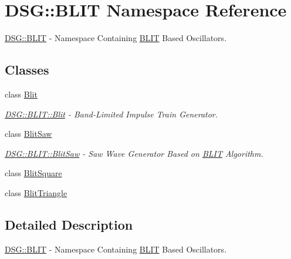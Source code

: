 \hypertarget{namespace_d_s_g_1_1_b_l_i_t}{\section{D\+S\+G\+:\+:B\+L\+I\+T Namespace Reference}
\label{namespace_d_s_g_1_1_b_l_i_t}
}


\hyperlink{namespace_d_s_g_1_1_b_l_i_t}{D\+S\+G\+::\+B\+L\+I\+T} -\/ Namespace Containing \hyperlink{namespace_d_s_g_1_1_b_l_i_t}{B\+L\+I\+T} Based Oscillators.  


\subsection*{Classes}
\begin{DoxyCompactItemize}
\item 
class \hyperlink{class_d_s_g_1_1_b_l_i_t_1_1_blit}{Blit}
\begin{DoxyCompactList}\small\item\em \hyperlink{class_d_s_g_1_1_b_l_i_t_1_1_blit}{D\+S\+G\+::\+B\+L\+I\+T\+::\+Blit} -\/ Band-\/\+Limited Impulse Train Generator. \end{DoxyCompactList}\item 
class \hyperlink{class_d_s_g_1_1_b_l_i_t_1_1_blit_saw}{Blit\+Saw}
\begin{DoxyCompactList}\small\item\em \hyperlink{class_d_s_g_1_1_b_l_i_t_1_1_blit_saw}{D\+S\+G\+::\+B\+L\+I\+T\+::\+Blit\+Saw} -\/ Saw Wave Generator Based on \hyperlink{namespace_d_s_g_1_1_b_l_i_t}{B\+L\+I\+T} Algorithm. \end{DoxyCompactList}\item 
class \hyperlink{class_d_s_g_1_1_b_l_i_t_1_1_blit_square}{Blit\+Square}
\item 
class \hyperlink{class_d_s_g_1_1_b_l_i_t_1_1_blit_triangle}{Blit\+Triangle}
\end{DoxyCompactItemize}


\subsection{Detailed Description}
\hyperlink{namespace_d_s_g_1_1_b_l_i_t}{D\+S\+G\+::\+B\+L\+I\+T} -\/ Namespace Containing \hyperlink{namespace_d_s_g_1_1_b_l_i_t}{B\+L\+I\+T} Based Oscillators. 